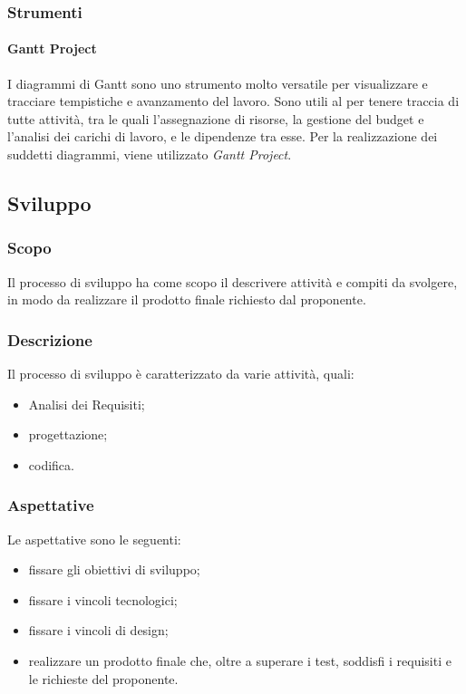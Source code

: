 \subsubsection{Strumenti}

\paragraph{Gantt Project}

I diagrammi di Gantt sono uno strumento molto versatile per visualizzare e tracciare tempistiche e avanzamento del lavoro.  Sono utili al \RdP{} per tenere traccia di tutte attività, tra le quali l'assegnazione di risorse,  la gestione del budget e l'analisi dei carichi di lavoro, e le dipendenze tra esse.  Per la realizzazione dei suddetti diagrammi, viene utilizzato \textit{Gantt Project}.

\subsection{Sviluppo}

\subsubsection{Scopo}

Il processo di sviluppo ha come scopo il descrivere attività e compiti da svolgere,  in modo da realizzare il prodotto finale richiesto dal proponente.

\subsubsection{Descrizione}

Il processo di sviluppo è caratterizzato da varie attività,  quali:
\begin{itemize}

\item Analisi dei Requisiti;

\item progettazione;

\item codifica.

\end{itemize}

\subsubsection{Aspettative}

Le aspettative sono le seguenti:
\begin{itemize}

\item fissare gli obiettivi di sviluppo;

\item fissare i vincoli tecnologici;

\item fissare i vincoli di design;

\item realizzare un prodotto finale che,  oltre a superare i test,  soddisfi i requisiti e le richieste del proponente.

\end{itemize}


